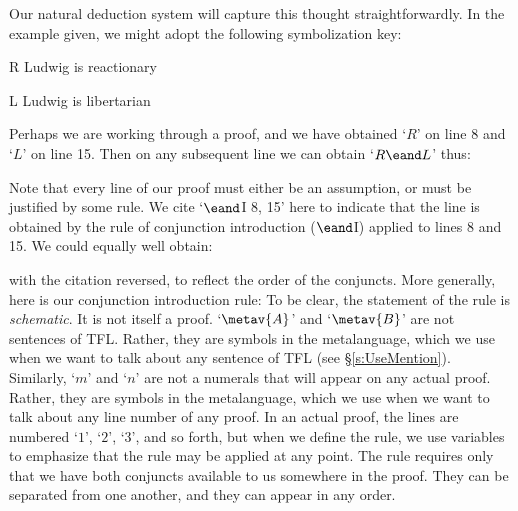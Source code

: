 Our natural deduction system will capture this thought straightforwardly. In the example given, we might adopt the following symbolization key:
	\begin{ekey}
		\item[R] Ludwig is reactionary
		\item[L] Ludwig is libertarian
	\end{ekey}
Perhaps we are working through a proof, and we have obtained `$R$' on line 8 and `$L$' on line 15. Then on any subsequent line we can obtain `$R \eand L$' thus:
\begin{fitchproof}
	 
\end{fitchproof}
Note that every line of our proof must either be an assumption, or must be justified by some rule. We cite `$\eand$I 8, 15' here to indicate that the line is obtained by the rule of conjunction introduction ($\eand$I) applied to lines 8 and 15. We could equally well obtain:
\begin{fitchproof}
	 
\end{fitchproof}
with the citation reversed, to reflect the order of the conjuncts. More generally, here is our conjunction introduction rule:
To be clear, the statement of the rule is \emph{schematic}. It is not itself a proof.  `$\metav{A}$' and `$\metav{B}$' are not sentences of TFL. Rather, they are symbols in the metalanguage, which we use when we want to talk about any sentence of TFL (see \S\ref{s:UseMention}). Similarly, `$m$' and `$n$' are not a numerals that will appear on any actual proof. Rather, they are symbols in the metalanguage, which we use when we want to talk about any line number of any proof. In an actual proof, the lines are numbered `$1$', `$2$', `$3$', and so forth, but when we define the rule, we use variables to emphasize that the rule may be applied at any point. The rule requires only that we have both conjuncts available to us somewhere in the proof. They can be separated from one another, and they can appear in any order.

